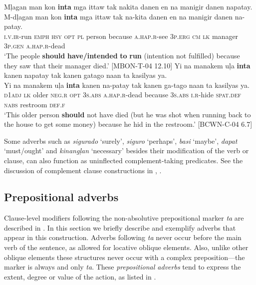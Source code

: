 \ea
\label{bkm:Ref443721187}
Mļagan  man  kon  \textbf{inta}  mga  ittaw  tak  nakita  danen  en na manigir  danen  napatay. \\\smallskip
 \gll M-dļagan  man  kon  \textbf{inta}  mga  ittaw  tak  na-kita  danen  en na manigir  danen  na-patay. \\
\textsc{i.v.ir}-run  \textsc{emph}  \textsc{hsy}  \textsc{opt}  \textsc{pl}  person  because  \textsc{a.hap.r}-see  3\textsc{p.erg}  \textsc{cm} \textsc{lk}  manager  3\textsc{p.gen}  \textsc{a.hap.r}-dead \\
\glt `The people \textbf{should} \textbf{have/intended} \textbf{to} \textbf{run} (intention not fulfilled) because they saw that their manager died.’ [MBON-T-04 12.10]
\z
\ea
\label{bkm:Ref443721212}
Yi  na  manakem  uļa  \textbf{inta}  kanen  napatay  tak kanen  gatago  naan  ta  kasilyas  ya. \\\smallskip
 \gll Yi  na  manakem  uļa  \textbf{inta}  kanen  na-patay  tak kanen  ga-tago  naan  ta  kasilyas  ya. \\
\textsc{d}1\textsc{adj}  \textsc{lk}  older  \textsc{neg.r}  \textsc{opt}    3\textsc{s.abs}  \textsc{a.hap.r}-dead  because
3\textsc{s.abs}  \textsc{i.r}-hide  \textsc{spat.def}  \textsc{nabs}  restroom  \textsc{def.f} \\
\glt `This older person \textbf{should} not have died (but he was shot when running back to the house to get some money) because he hid in the restroom.’ [BCWN-C-04 6.7]
\z

Some adverbs such as \textit{sigurado} ‘surely’, \textit{siguro} ‘perhaps’, \textit{basi} ‘maybe’, \textit{dapat} ‘must/ought’ and \textit{kinangļan} ‘necessary’ besides their modification of the verb or clause, can also function as uninflected complement-taking predicates. See the discussion of complement clause constructions in , .

\subsection{Prepositional adverbs}
\label{bkm:Ref480640397} 

Clause-level modifiers following the non-absolutive prepositional marker \textit{ta} are described in . In this section we briefly describe and exemplify adverbs that appear in this construction. Adverbs following \textit{ta} never occur before the main verb of the sentence, as allowed for locative oblique elements. Also, unlike other oblique elements these structures never occur with a complex preposition---the marker is always and only \textit{ta}. These \textit{prepositional adverbs} tend to express the extent, degree or value of the action, as listed in .

